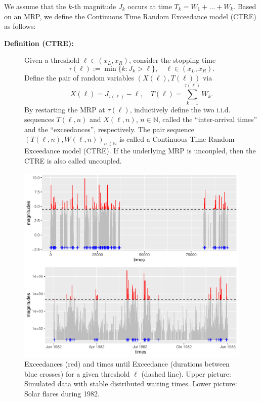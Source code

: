 \documentclass[]{elsarticle} %
\begin{document}
We assume that the \(k\)-th magnitude \(J_k\) occurs at time
\(T_k = W_1 + \ldots + W_k\). Based on an MRP, we define the Continuous
Time Random Exceedance model (CTRE) as follows:

\begin{description}
\item[\textbf{Definition (CTRE):}]
Given a threshold \(\ell \in (x_L, x_R)\), consider the stopping time
\[\tau(\ell) := \min\{k: J_k > \ell\},\quad \ell \in (x_L, x_R).\]
Define the pair of random variables \((X(\ell), T(\ell))\) via
\[X(\ell) = J_{\tau(\ell)} - \ell, \quad 
T(\ell) = \sum_{k=1}^{\tau(\ell)} W_k.\] By restarting the MRP at
\(\tau(\ell)\), inductively define the two i.i.d. sequences
\(T(\ell,n)\) and \(X(\ell, n)\), \(n \in \mathbb N\), called the
``inter-arrival times'' and the ``exceedances'', respectively. The pair
sequence \((T(\ell, n), W(\ell, n))_{n \in \mathbb N}\) is called a
Continuous Time Random Exceedance model (CTRE). If the underlying MRP is
uncoupled, then the CTRE is also called uncoupled.
\end{description}

\begin{figure}

{\centering \includegraphics[width=0.7\linewidth]{article_springer_files/figure-latex/thresholdedBursty-1} 

}

\caption{\label{fig:thresholdedBursty} Exceedances (red) and times until Exceedance (durations between blue crosses) for a given threshold $\ell$ (dashed line). Upper picture: Simulated data with stable distributed waiting times. Lower picture: Solar flares during 1982.}\label{fig:thresholdedBursty}
\end{figure}
\end{document}
